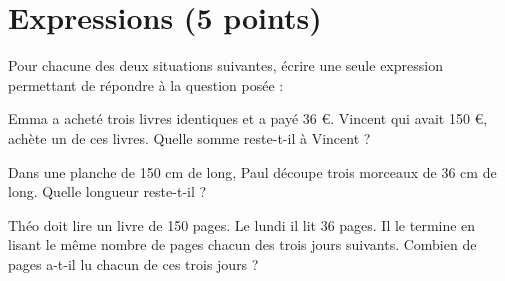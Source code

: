 \section{Expressions (5 points)}

Pour chacune des deux situations suivantes, écrire une seule expression permettant de répondre à la question posée :

\begin{questions}
	\question[1\half] Emma a acheté trois livres identiques et a payé 36 €. Vincent qui avait 150 €, achète un de ces livres. Quelle somme reste-t-il à Vincent ?
	
	\question[1\half] Dans une planche de 150 cm de long, Paul découpe trois morceaux de 36 cm de long. Quelle longueur reste-t-il ?
	
	\question[2] Théo doit lire un livre de 150 pages. Le lundi il lit 36 pages. Il le termine en lisant le même nombre de pages chacun des trois jours suivants. Combien de pages a-t-il lu chacun de ces trois jours ?
\end{questions}